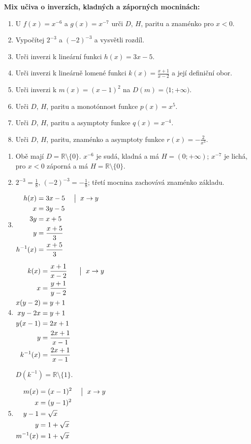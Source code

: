 \documentclass[11pt,a4paper]{article}
\begin{document}
\begin{zadaniReseniBox}[title={Domácí úkol}]
\textbf{Mix učiva o inverzích, kladných a záporných mocninách:}
\begin{enumerate}[label=\alph*)]
\item U $f(x)=x^{-6}$ a $g(x)=x^{-7}$ urči $D$, $H$, paritu a znaménko pro $x<0$.
\item Vypočítej $2^{-3}$ a $(-2)^{-3}$ a vysvětli rozdíl.
\item Urči inverzi k lineární funkci $h(x)=3x-5$.
\item Urči inverzi k lineárně lomené funkci $k(x)=\frac{x+1}{x-2}$ a její definiční obor.
\item Urči inverzi k $m(x)=(x-1)^2$ na $D(m)=\langle1;+\infty)$.
\item Urči $D$, $H$, paritu a monotónnost funkce $p(x)=x^5$.
\item Urči $D$, $H$, paritu a asymptoty funkce $q(x)=x^{-4}$.
\item Urči $D$, $H$, paritu, znaménko a asymptoty funkce $r(x)=-\frac{2}{x^3}$.
\end{enumerate}
\tcblower
\begin{enumerate}[label=\alph*)]
\item Obě mají $D=\mathbb R\setminus\{0\}$. $x^{-6}$ je sudá, kladná a má $H=(0;+\infty)$; $x^{-7}$ je lichá, pro $x<0$ záporná a má $H=\mathbb R\setminus\{0\}$.
\item $2^{-3}=\frac{1}{8}$, $(-2)^{-3}=-\frac{1}{8}$; třetí mocnina zachovává znaménko základu.
\item
\(\displaystyle\begin{aligned}h(x)&=3x-5 &&\bigm|\ x\to y\\x&=3y-5\\3y&=x+5\\y&=\frac{x+5}{3}\\h^{-1}(x)&=\frac{x+5}{3}\end{aligned}\)
\item
\(\displaystyle\begin{aligned}k(x)&=\frac{x+1}{x-2} &&\bigm|\ x\to y\\x&=\frac{y+1}{y-2}\\x(y-2)&=y+1\\xy-2x&=y+1\\y(x-1)&=2x+1\\y&=\frac{2x+1}{x-1}\\k^{-1}(x)&=\frac{2x+1}{x-1}\end{aligned}\)

$D(k^{-1})=\mathbb R\setminus\{1\}$.
\item
\(\displaystyle\begin{aligned}m(x)&=(x-1)^2 &&\bigm|\ x\to y\\x&=(y-1)^2\\y-1&=\sqrt{x}\\y&=1+\sqrt{x}\\m^{-1}(x)&=1+\sqrt{x}\end{aligned}\)


\end{enumerate}
\end{zadaniReseniBox}
\end{document}
